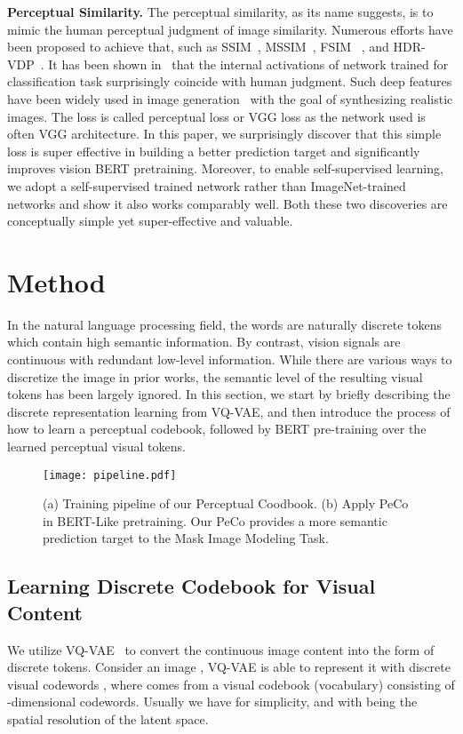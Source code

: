 \documentclass[letterpaper]{article} \usepackage{aaai23}  \usepackage{times}  \usepackage{helvet}  \usepackage{courier}  \usepackage[hyphens]{url}  \usepackage{graphicx} \urlstyle{rm} \def\UrlFont{\rm}  \usepackage{natbib}  \usepackage{caption} \frenchspacing  \setlength{\pdfpagewidth}{8.5in}  \setlength{\pdfpageheight}{11in}  \usepackage{algorithm}
\begin{document}
\noindent \textbf{Perceptual Similarity.}
The perceptual similarity, as its name suggests, is to mimic the human perceptual
judgment of image similarity.
Numerous efforts have been proposed to achieve that, such as SSIM~\cite{wang2004image}, MSSIM~\cite{wang2003multiscale}, FSIM ~\cite{zhang2011fsim}, and HDR-VDP~\cite{mantiuk2011hdr}.
It has been shown in~\cite{zhang2018unreasonable} that the internal activations of network trained for classification task surprisingly coincide with human judgment. 
Such deep features have been widely used in image generation~\cite{gatys2016image,johnson2016perceptual,chen2017stylebank,bruna2015super,ledig2017photo,esser2021taming} with the goal of synthesizing realistic images.
The loss is called perceptual loss or VGG loss as the network used is often VGG architecture.
In this paper, we surprisingly discover that this simple loss is super effective in building a better prediction target and significantly improves vision BERT pretraining. 
Moreover, to enable self-supervised learning, we adopt a self-supervised trained network rather than ImageNet-trained networks and show it also works comparably well. Both these two discoveries are conceptually simple yet super-effective and valuable. 

\section{Method}
In the natural language processing field, the words are naturally discrete tokens which contain high semantic information. By contrast, vision signals are continuous with redundant low-level information.
While there are various ways to discretize the image in prior works, the semantic level of the resulting visual tokens has been largely ignored. 
In this section, we start by briefly describing the discrete representation learning from VQ-VAE,
and then introduce the process of how to learn a perceptual codebook,
followed by BERT pre-training over the learned perceptual visual tokens.

\begin{figure*}[t]\centering
\texttt{[image: pipeline.pdf]}
\caption{(a) Training pipeline of our Perceptual Coodbook. (b) Apply PeCo in BERT-Like pretraining. Our PeCo provides a more semantic prediction target to the Mask Image Modeling Task. 
}
\label{fig:pipeline}
\end{figure*}

\subsection{Learning Discrete Codebook for Visual Content}
We utilize VQ-VAE~\cite{oord2017neural} 
to convert the continuous image content into the form of discrete tokens.
Consider an image , VQ-VAE is able to represent it with discrete visual codewords , 
where  comes from a visual codebook (vocabulary)  consisting of  -dimensional codewords. Usually we have  for simplicity,
and  with  being the spatial resolution of the latent space.
\end{document}

